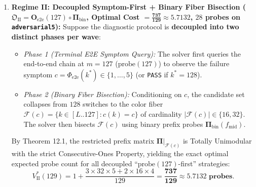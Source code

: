 \documentclass[11pt,a4paper]{article}
\theoremstyle{definition}
\theoremstyle{remark}
\begin{document}
\begin{enumerate}[leftmargin=1.6em]
    \item \textbf{Regime II: Decoupled Symptom-First + Binary Fiber Bisection ($\mathfrak{O}_{\text{II}} = \bm{O}_{\text{e2e}}(127) \circ \bm{\Pi}_{\text{bin}}$, Optimal Cost $= \mathbf{\frac{737}{129} \approx 5.7132}$, $28$ probes on \texttt{adversarial5}):}
    Suppose the diagnostic protocol is \textbf{decoupled into two distinct phases per wave}:
    \begin{itemize}
        \item \emph{Phase 1 (Terminal E2E Symptom Query):} The solver first queries the end-to-end chain at $m = 127$ ($\text{probe}(127)$) to observe the failure symptom $c = \Phi_{\text{e2e}}(k^*) \in \{1,\dots,5\}$ (or \texttt{PASS} if $k^* = 128$).
        \item \emph{Phase 2 (Binary Fiber Bisection):} Conditioning on $c$, the candidate set collapses from $128$ switches to the color fiber $\mathcal{F}(c) = \{k \in [L..127] : c(k) = c\}$ of cardinality $|\mathcal{F}(c)| \in \{16, 32\}$. The solver then bisects $\mathcal{F}(c)$ using binary prefix probes $\bm{\Pi}_{\text{bin}}(f_{\text{mid}})$.
    \end{itemize}
    By Theorem 12.1, the restricted prefix matrix $\bm{\Pi}|_{\mathcal{F}(c)}$ is Totally Unimodular with the strict Consecutive-Ones Property, yielding the exact optimal expected probe count for all decoupled ``$\text{probe}(127)$-first'' strategies:
    \begin{equation}
        V_{\text{II}}^*(129) = 1 + \frac{3 \times 32 \times 5 + 2 \times 16 \times 4}{129} = \mathbf{\frac{737}{129} \approx 5.7132\text{ probes}}.
    \end{equation}


\end{enumerate}
\end{document}
